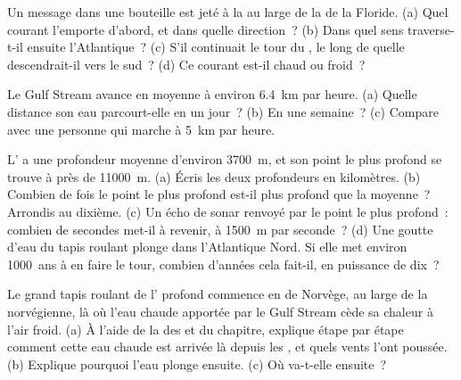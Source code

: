 \begin{exercise}[$\star\star$]\label{exo:g8:the-oceans:9}
Un message dans une bouteille est jeté à la  au large de la  de la
Floride. (a) Quel courant l'emporte d'abord, et dans quelle direction~?
(b) Dans quel sens traverse-t-il ensuite l'Atlantique~? (c) S'il
continuait le tour du , le long de quelle  descendrait-il vers le
sud~? (d) Ce courant est-il chaud ou froid~?
\end{exercise}

\begin{exercise}[$\star\star$]\label{exo:g8:the-oceans:10}
Le Gulf Stream avance en moyenne à environ \qty{6.4}{km} par heure. (a)
Quelle distance son eau parcourt-elle en un jour~? (b) En une semaine~?
(c) Compare avec une personne qui marche à \qty{5}{km} par heure.
\end{exercise}

\begin{exercise}[$\star\star\star$]\label{exo:g8:the-oceans:11}
L' a une profondeur moyenne d'environ \qty{3700}{m}, et son point le
plus profond se trouve à près de \qty{11000}{m}. (a) Écris les deux
profondeurs en kilomètres. (b) Combien de fois le point le plus profond
est-il plus profond que la moyenne~? Arrondis au dixième. (c) Un écho de
sonar renvoyé par le point le plus profond~: combien de secondes met-il à
revenir, à \qty{1500}{m} par seconde~? (d) Une goutte d'eau du tapis
roulant plonge dans l'Atlantique Nord. Si elle met environ \num{1000}~ans
à en faire le tour, combien d'années cela fait-il, en puissance de dix~?
\end{exercise}

\begin{exercise}[$\star\star\star$]\label{exo:g8:the-oceans:12}
Le grand tapis roulant de l' profond commence en  de Norvège, au
large de la  norvégienne, là où l'eau chaude apportée par le Gulf
Stream cède sa chaleur à l'air froid. (a) À l'aide de la  des 
et du chapitre, explique étape par étape comment cette eau chaude est
arrivée là depuis les , et quels vents l'ont poussée. (b)
Explique pourquoi l'eau plonge ensuite. (c) Où va-t-elle ensuite~?
\end{exercise}

